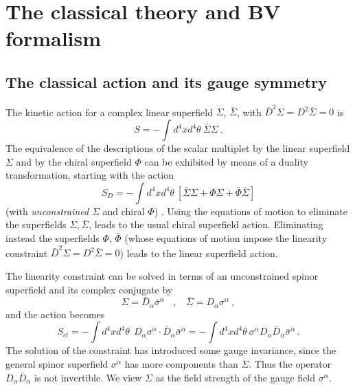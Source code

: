 \documentclass[a4paper,12pt]{article}
\begin{document}
\newpage

\section{The classical theory and  BV formalism}
\label{review}

\subsection{The classical action and its gauge symmetry}
\label{classical}

The kinetic action for a complex linear superfield $\Sigma$, $\bar\Sigma$,
with $\bar D^2 \Sigma = D^2 \bar\Sigma =0$ is 
\begin{equation}
  S=- \int d^4x d^4 \theta ~ \bar\Sigma \Sigma~.
\end{equation}
The equivalence of the descriptions of the scalar
multiplet by the linear superfield $\Sigma$ and by the chiral superfield
$\Phi$ can be exhibited by means of a duality transformation, starting
with the action
\begin{equation}
  S_D = -\int d^4x d^4 \theta ~ [ \bar{\Sigma} \Sigma +\Phi \Sigma
+\bar\Phi \bar{\Sigma} ]
\end{equation}
(with { \em unconstrained} $\Sigma$ and chiral
$\Phi$) \cite{superspace}.  Using the equations of motion to eliminate
the superfields $\Sigma, \bar\Sigma$, leads to the usual chiral superfield
action. Eliminating instead the superfields $\Phi$, $\bar\Phi$ (whose
equations of motion impose the linearity constraint $\bar D^2 \Sigma = D^2
\bar\Sigma =0 $) leads to the linear superfield action.

The linearity constraint can be solved in terms of an unconstrained
spinor superfield and its complex conjugate by
\begin{equation}
\Sigma = \bar D _{\dot\alpha} \bar\sigma^{\dot\alpha} ~~~~,~~~~
\bar\Sigma = D_\alpha \sigma^\alpha \ , 
\end{equation}
and the action becomes
\begin{equation}
S_{cl}= -\int d^4x d^4 \theta ~~D_\alpha \sigma^\alpha \cdot \bar
D_{\dot\alpha} \bar\sigma^{\dot\alpha}
=-\int d^4x d^4 \theta  ~\sigma^\alpha D_\alpha \bar D_{\dot\alpha}
\bar\sigma^{\dot\alpha} \, .
\label{Scl}
\end{equation}
The solution of the constraint has introduced some gauge invariance,
since the general spinor superfield $\sigma^\alpha$ has more
components than $\Sigma$. Thus 
the operator $D_\alpha \bar D_{\dot\alpha}$ is not invertible.
We view $\Sigma$ as the field strength of the gauge field $\sigma^\alpha$.
\end{document}
